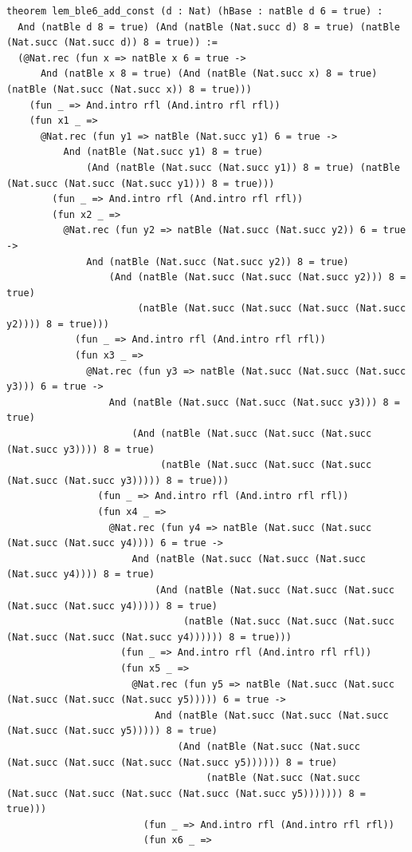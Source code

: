 \documentclass[10pt,twocolumn]{article}
\theoremstyle{spectralthm}
\begin{document}
\begin{lstlisting}[language=Lean4,caption={Standalone Pure Init.Prelude Term-Mode Lean 4 Expansion (thm30--thm37, v1.1.0, 0 sorry, 0 axioms).},label={lst:lean_v110}]
theorem lem_ble6_add_const (d : Nat) (hBase : natBle d 6 = true) :
  And (natBle d 8 = true) (And (natBle (Nat.succ d) 8 = true) (natBle (Nat.succ (Nat.succ d)) 8 = true)) :=
  (@Nat.rec (fun x => natBle x 6 = true ->
      And (natBle x 8 = true) (And (natBle (Nat.succ x) 8 = true) (natBle (Nat.succ (Nat.succ x)) 8 = true)))
    (fun _ => And.intro rfl (And.intro rfl rfl))
    (fun x1 _ =>
      @Nat.rec (fun y1 => natBle (Nat.succ y1) 6 = true ->
          And (natBle (Nat.succ y1) 8 = true)
              (And (natBle (Nat.succ (Nat.succ y1)) 8 = true) (natBle (Nat.succ (Nat.succ (Nat.succ y1))) 8 = true)))
        (fun _ => And.intro rfl (And.intro rfl rfl))
        (fun x2 _ =>
          @Nat.rec (fun y2 => natBle (Nat.succ (Nat.succ y2)) 6 = true ->
              And (natBle (Nat.succ (Nat.succ y2)) 8 = true)
                  (And (natBle (Nat.succ (Nat.succ (Nat.succ y2))) 8 = true)
                       (natBle (Nat.succ (Nat.succ (Nat.succ (Nat.succ y2)))) 8 = true)))
            (fun _ => And.intro rfl (And.intro rfl rfl))
            (fun x3 _ =>
              @Nat.rec (fun y3 => natBle (Nat.succ (Nat.succ (Nat.succ y3))) 6 = true ->
                  And (natBle (Nat.succ (Nat.succ (Nat.succ y3))) 8 = true)
                      (And (natBle (Nat.succ (Nat.succ (Nat.succ (Nat.succ y3)))) 8 = true)
                           (natBle (Nat.succ (Nat.succ (Nat.succ (Nat.succ (Nat.succ y3))))) 8 = true)))
                (fun _ => And.intro rfl (And.intro rfl rfl))
                (fun x4 _ =>
                  @Nat.rec (fun y4 => natBle (Nat.succ (Nat.succ (Nat.succ (Nat.succ y4)))) 6 = true ->
                      And (natBle (Nat.succ (Nat.succ (Nat.succ (Nat.succ y4)))) 8 = true)
                          (And (natBle (Nat.succ (Nat.succ (Nat.succ (Nat.succ (Nat.succ y4))))) 8 = true)
                               (natBle (Nat.succ (Nat.succ (Nat.succ (Nat.succ (Nat.succ (Nat.succ y4)))))) 8 = true)))
                    (fun _ => And.intro rfl (And.intro rfl rfl))
                    (fun x5 _ =>
                      @Nat.rec (fun y5 => natBle (Nat.succ (Nat.succ (Nat.succ (Nat.succ (Nat.succ y5))))) 6 = true ->
                          And (natBle (Nat.succ (Nat.succ (Nat.succ (Nat.succ (Nat.succ y5))))) 8 = true)
                              (And (natBle (Nat.succ (Nat.succ (Nat.succ (Nat.succ (Nat.succ (Nat.succ y5)))))) 8 = true)
                                   (natBle (Nat.succ (Nat.succ (Nat.succ (Nat.succ (Nat.succ (Nat.succ (Nat.succ y5))))))) 8 = true)))
                        (fun _ => And.intro rfl (And.intro rfl rfl))
                        (fun x6 _ =>

\end{lstlisting}
\end{document}
